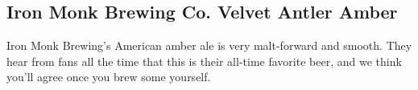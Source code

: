 \documentclass[10pt,oneside]{scrbook}
\begin{document}
\begin{ingredientsblock}

\begin{malts}
\end{malts}

\begin{hops}
\end{hops}

\begin{yeasts}
\end{yeasts}

\end{ingredientsblock}

\part{\styleamericanamberale}

\chapter*{Iron Monk Brewing Co. Velvet Antler Amber}

\begin{aboutblock}
Iron Monk Brewing's American amber ale is very malt-forward and smooth. They hear from
fans all the time that this is their all-time favorite beer, and we think you’ll agree
once you brew some yourself.
\end{aboutblock}


\begin{methodandtiming}
 
\begin{mashsteps}
\end{mashsteps}

\begin{fermentationsteps}
\end{fermentationsteps}

\end{methodandtiming}
\end{document}
